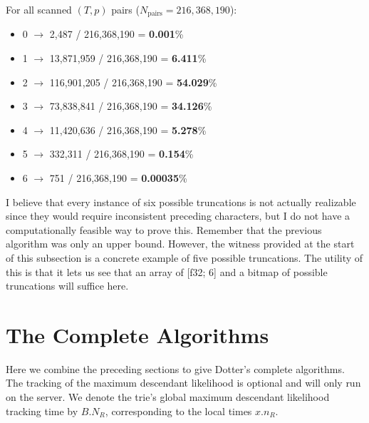 For all scanned $(T, p)$ pairs ($N_{\text{pairs}} = 216,\!368,\!190$):

\begin{itemize}
    \item 0 $\to$ 2,487 / 216,368,190 = \textbf{0.001}\%
    \item 1 $\to$ 13,871,959 / 216,368,190 = \textbf{6.411}\%
    \item 2 $\to$ 116,901,205 / 216,368,190 = \textbf{54.029}\%
    \item 3 $\to$ 73,838,841 / 216,368,190 = \textbf{34.126}\%
    \item 4 $\to$ 11,420,636 / 216,368,190 = \textbf{5.278}\%
    \item 5 $\to$ 332,311 / 216,368,190 = \textbf{0.154}\%
    \item 6 $\to$ 751 / 216,368,190 = \textbf{0.00035}\%
\end{itemize}

I believe that every instance of six possible truncations is not actually realizable
since they would require inconsistent preceding characters, but I do not have a computationally
feasible way to prove this. Remember that the previous algorithm was only an upper bound.
However, the witness provided at the start of this subsection is a concrete example
of five possible truncations. 
The utility of this is that it lets us see that an array of [f32; 6] and a bitmap of possible truncations
will suffice here.




\section{The Complete Algorithms}
\label{sec:complete-algorithms}
Here we combine the preceding sections
to give Dotter's complete algorithms.
The tracking of the maximum descendant likelihood
is optional and will only run on the server.
We denote the trie's global maximum descendant likelihood tracking time by $B.N_R$,
corresponding to the local times $x.n_R$.


